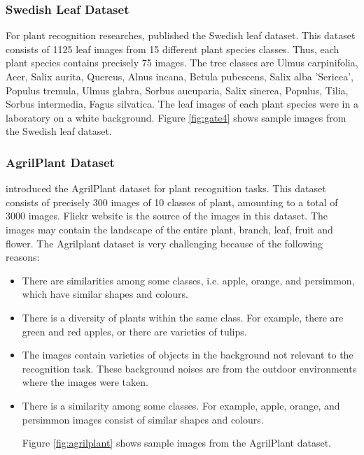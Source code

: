 \documentclass[conference]{IEEEtran}
\begin{document}
\subsubsection{Swedish Leaf Dataset}
For plant recognition researches, \cite{soderkvist2001computer} published the Swedish leaf dataset. This dataset consists of 1125 leaf images from 15 different plant species classes. Thus, each plant species contains precisely 75 images. The tree classes are Ulmus carpinifolia, Acer, Salix aurita, Quercus, Alnus incana, Betula pubescens, Salix alba 'Sericea', Populus tremula, Ulmus glabra, Sorbus aucuparia, Salix sinerea, Populus, Tilia, Sorbus intermedia, Fagus silvatica. The leaf images of each plant species were in a laboratory on a white background. Figure \ref{fig:gate4} shows sample images from the Swedish leaf dataset.


\subsubsection{AgrilPlant Dataset}
 \cite{pawara2017comparing} introduced the AgrilPlant dataset for plant recognition tasks. This dataset consists of precisely 300 images of 10 classes of plant, amounting to a total of 3000 images. Flickr website is the source of the images in this dataset. The images may contain the landscape of the entire plant, branch, leaf, fruit and flower. The Agrilplant dataset is very challenging because of the following reasons:
 
 \begin{itemize}
     \item There are similarities among some classes, i.e. apple, orange, and persimmon, which have similar shapes and colours.
     \item There is a diversity of plants within the same class. For example, there are green and red apples, or there are varieties of tulips.
     \item The images contain varieties of objects in the background not relevant to the recognition task. These background noises are from the outdoor environments where the images were taken.
     \item There is a similarity among some classes. For example, apple, orange, and persimmon images consist of similar shapes and colours.

Figure \ref{fig:agrilplant} shows sample images from the AgrilPlant dataset.

 \end{itemize}
 
\end{document}
